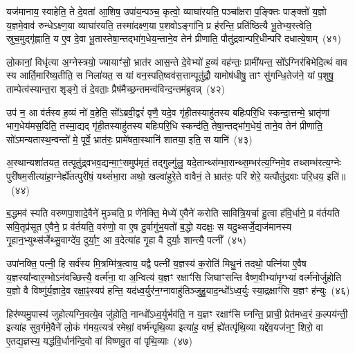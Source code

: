 यज॑मानाय॒ स्वाहेति॒ ते दे॒वता॑ आ॒शिष॒ उपा॑य॒न्पञ्च॒ कृत्वो॒ व्याघा॑रयति॒ पञ्चा᳚क्षरा प॒ङ्क्तिः पाङ्क्तो॑ य॒ज्ञो य॒ज्ञमे॒वाव॑ रुन्धे\-ऽक्ष्ण॒या व्याघा॑रयति॒ तस्मा॑दक्ष्ण॒या प॒शवो\-ऽङ्गा॑नि॒ प्र ह॑रन्ति॒ प्रति॑ष्ठित्यै भू॒तेभ्य॒स्त्वेति॒ स्रुच॒मुद्गृ॑ह्णाति॒ य ए॒व दे॒वा भू॒तास्तेषा॒न्तद्भा॑ग॒धेय॒न्ताने॒व तेन॑ प्रीणाति॒ पौतु॑द्रवान्परि॒धीन्परि॑ दधात्ये॒षाम्~(४१)

लो॒कानां॒ विधृ॑त्या अ॒ग्नेस्त्रयो॒ ज्यायाꣳ॑सो॒ भ्रात॑र आस॒न्ते दे॒वेभ्यो॑ ह॒व्यं वह॑न्तः॒ प्रामी॑यन्त॒ सो᳚\-ऽग्निर॑बिभेदि॒त्थं वाव स्य आर्ति॒मारि॑ष्य॒तीति॒ स निला॑यत॒ स यां वन॒स्पति॒ष्वव॑स॒त्ताम्पूतु॑द्रौ॒ यामोष॑धीषु॒ ताꣳ सु॑गन्धि॒तेज॑ने॒ यां प॒शुषु॒ ताम्पेत्व॑स्यान्त॒रा शृङ्गे॒ तं दे॒वताः॒ प्रैष॑मैच्छ॒न्तमन्व॑विन्द॒न्तम॑ब्रुवन्न्~(४२)

उप॑ न॒ आ व॑र्तस्व ह॒व्यं नो॑ व॒हेति॒ सो᳚\-ऽब्रवी॒द्वरं॑ वृणै॒ यदे॒व गृ॑ही॒तस्याहु॑तस्य बहिःपरि॒धि स्कन्दा॒त्तन्मे॒ भ्रातृ॑णां भाग॒धेय॑मस॒दिति॒ तस्मा॒द्यद् गृ॑ही॒तस्याहु॑तस्य बहिःपरि॒धि स्कन्द॑ति॒ तेषा॒न्तद्भा॑ग॒धेयं॒ ताने॒व तेन॑ प्रीणाति॒ सो॑\-ऽमन्यतास्थ॒न्वन्तो॑ मे॒ पूर्वे॒ भ्रात॑रः॒ प्रामे॑षता॒स्थानि॑ शातया॒ इति॒ स यानि॑~(४३)

अ॒स्थान्यशा॑तयत॒ तत्पूतु॑द्र्वभव॒द्यन्मा॒ꣳ॒समुप॑मृतं॒ तद्गुल्गु॑लु॒ यदे॒तान्थ्स॑म्भा॒रान्थ्स॒म्भर॑त्य॒ग्निमे॒व तथ्सम्भ॑रत्य॒ग्नेः पुरी॑षम॒सीत्या॑हा॒ग्नेर्\mbox{}ह्ये॑तत्पुरी॑षं॒ यथ्सं॑भा॒रा अथो॒ खल्वा॑हुरे॒ते वावैनं॒ ते भ्रात॑रः॒ परि॑ शेरे॒ यत्पौतु॑द्रवाः परि॒धय॒ इति॑॥~(४४)

{\anuvakamend[{वि॒त्त्वा दे॑वय॒त ए॒षाम॑ब्रुव॒न्॒ यानि॒ चतु॑श्चत्वारिꣳशच्च}]}%

ब॒द्धमव॑ स्यति वरुणपा॒शादे॒वैने॑ मुञ्चति॒ प्र णे॑नेक्ति॒ मेध्ये॑ ए॒वैने॑ करोति सावित्रि॒यर्चा हु॒त्वा ह॑वि॒र्धाने॒ प्र व॑र्तयति सवि॒तृप्र॑सूत ए॒वैने॒ प्र व॑र्तयति॒ वरु॑णो॒ वा ए॒ष दु॒र्वागु॑भ॒यतो॑ ब॒द्धो यदक्षः॒ स यदु॒थ्सर्जे॒द्यज॑मानस्य गृ॒हान॒भ्युथ्स॑र्जेथ्सु॒वाग्दे॑व॒ दुर्या॒ꣳ॒ आ व॒देत्या॑ह गृ॒हा वै दुर्याः॒ शान्त्यै॒ पत्नी᳚~(४५)

उपा॑नक्ति॒ पत्नी॒ हि सर्व॑स्य मि॒त्रम्मि॑त्र॒त्वाय॒ यद्वै पत्नी॑ य॒ज्ञस्य॑ क॒रोति॑ मिथु॒नं तदथो॒ पत्नि॑या ए॒वैष य॒ज्ञस्या᳚न्वार॒म्भो\-ऽन॑वच्छित्त्यै॒ वर्त्म॑ना॒ वा अ॒न्वित्य॑ य॒ज्ञꣳ रक्षाꣳ॑सि जिघाꣳसन्ति वैष्ण॒वीभ्या॑मृ॒ग्भ्यां वर्त्म॑नोर्जुहोति य॒ज्ञो वै विष्णु॑र्य॒ज्ञादे॒व रक्षा॒ꣴ॒स्यप॑ हन्ति॒ यद॑ध्व॒र्युर॑न॒ग्नावाहु॑तिञ्जुहु॒याद॒न्धो᳚\-ऽध्व॒र्युः स्या॒द्रक्षाꣳ॑सि य॒ज्ञꣳ ह॑न्युः~(४६)

हिर॑ण्यमु॒पास्य॑ जुहोत्यग्नि॒वत्ये॒व जु॑होति॒ नान्धो᳚\-ऽध्व॒र्युर्भव॑ति॒ न य॒ज्ञꣳ रक्षाꣳ॑सि घ्नन्ति॒ प्राची॒ प्रेत॑मध्व॒रं क॒ल्पय॑न्ती॒ इत्या॑ह सुव॒र्गमे॒वैने॑ लो॒कं ग॑मय॒त्यत्र॑ रमेथां॒ वर्ष्म॑न्पृथि॒व्या इत्या॑ह॒ वर्ष्म॒ ह्ये॑तत्पृ॑थि॒व्या यद्दे॑व॒यज॑न॒ꣳ॒ शिरो॒ वा ए॒तद्य॒ज्ञस्य॒ यद्ध॑वि॒र्धान॑न्दि॒वो वा॑ विष्णवु॒त वा॑ पृथि॒व्याः~(४७)

